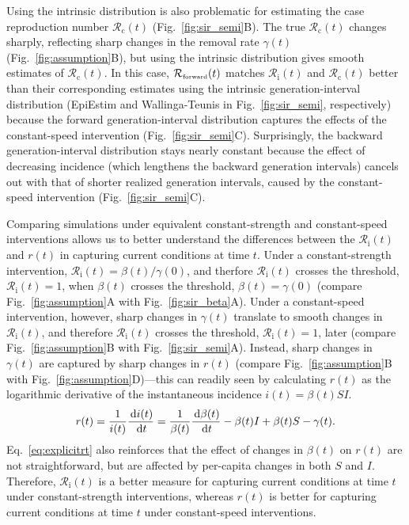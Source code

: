 \documentclass[12pt]{article}
\newcommand{\eref}[1]{Eq.~\ref{eq:#1}}
\newcommand{\fref}[1]{Fig.~\ref{fig:#1}}
\newcommand{\Rx}[1]{\ensuremath{{\mathcal R}_{#1}}\xspace}
\newcommand{\Rc}{\Rx{\mathrm{c}}}
\newcommand{\Ri}{\Rx{\mathrm{i}}}
\newcommand{\RR}{\ensuremath{{\mathcal R}}\xspace}
\newcommand{\tsub}[2]{#1_{{\textrm{\tiny #2}}}}
\newcommand{\dd}[1]{\ensuremath{\, \mathrm{d}#1}}
\begin{document}
Using the intrinsic distribution is also problematic for estimating the case reproduction number $\Rc(t)$ (\fref{sir_semi}B).
The true $\Rc(t)$ changes sharply, reflecting sharp changes in the removal rate $\gamma(t)$ (\fref{assumption}B), but using the intrinsic distribution gives smooth estimates of $\Rc(t)$.
In this case, $\tsub{\RR}{forward}(t)$ matches $\Ri(t)$ and $\Rc(t)$ better than their corresponding estimates using the intrinsic generation-interval distribution (EpiEstim and Wallinga-Teunis in \fref{sir_semi}, respectively) because the forward generation-interval distribution captures the effects of the constant-speed intervention (\fref{sir_semi}C).
Surprisingly, the backward generation-interval distribution stays nearly constant because the effect of decreasing incidence (which lengthens the backward generation intervals) cancels out with that of shorter realized generation intervals, caused by the constant-speed intervention (\fref{sir_semi}C).

Comparing simulations under equivalent constant-strength and constant-speed interventions allows us to better understand the differences between the $\Ri(t)$ and $r(t)$ in capturing current conditions at time $t$.
Under a constant-strength intervention, $\Ri(t) = \beta(t)/\gamma(0)$, and therfore $\Ri(t)$ crosses the threshold, $\Ri(t) = 1$, when $\beta(t)$ crosses the threshold, $\beta(t) = \gamma(0)$ (compare \fref{assumption}A with \fref{sir_beta}A).
Under a constant-speed intervention, however, sharp changes in $\gamma(t)$ translate to smooth changes in $\Ri(t)$, and therefore $\Ri(t)$ crosses the threshold, $\Ri(t) = 1$, later (compare \fref{assumption}B with \fref{sir_semi}A).
Instead, sharp changes in $\gamma(t)$ are captured by sharp changes in $r(t)$ (compare \fref{assumption}B with \fref{assumption}D)---this can readily seen by calculating $r(t)$ as the logarithmic derivative of the instantaneous incidence $i(t) = \beta(t) S I$.
\begin{equation}
r(t) =  \frac{1}{i(t)} \frac{\dd i(t)}{\dd t}\\
= \frac{1}{\beta(t)} \frac{\dd \beta(t)}{\dd t} - \beta(t) I + \beta(t) S - \gamma(t). \label{eq:explicitrt}
\end{equation}
\eref{explicitrt} also reinforces that the effect of changes in $\beta(t)$ on $r(t)$ are not straightforward, but are affected by per-capita changes in both $S$ and $I$.
Therefore, $\Ri(t)$ is a better measure for capturing current conditions at time $t$ under constant-strength interventions, whereas $r(t)$ is better for capturing current conditions at time $t$ under constant-speed interventions. 
\end{document}
